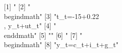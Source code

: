  [1] "%
 [2] "\\begin{dmath}"                                                                                                                                                                                                                                                                                                                              
 [3] "{t_{t}}=-15+0.22\\, {y_{t}}+{ut_{t}}"                                                                                                                                                                                                                                                                                                        
 [4] "\\end{dmath}"                                                                                                                                                                                                                                                                                                                                
 [5] ""                                                                                                                                                                                                                                                                                                                                            
 [6] "%
 [7] "\\begin{dmath}"                                                                                                                                                                                                                                                                                                                              
 [8] "{y_{t}}={c_{t}}+{i_{t}}+{g_{t}}"                                                                                                                                                                                                                                                                                                             
